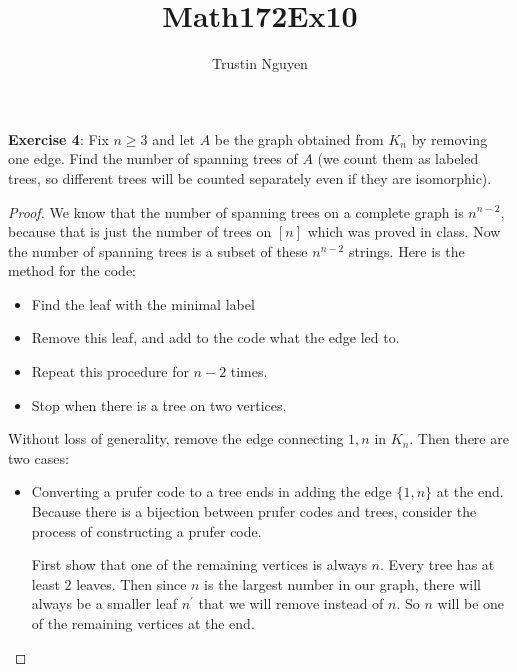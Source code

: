 \documentclass{article}
\title{Math172Ex10}
\author{Trustin Nguyen}
\begin{document}
    \maketitle

\reversemarginpar

\textbf{Exercise 4}: Fix $n \geq 3$ and let $A$ be the graph obtained from $K_{n}$ by removing one edge. Find the number of spanning trees of $A$ (we count them as labeled trees, so different trees will be counted separately even if they are isomorphic).
    \begin{proof}
        We know that the number of spanning trees on a complete graph is $n^{n - 2}$, because that is just the number of trees on $[n]$ which was proved in class. Now the number of spanning trees is a subset of these $n^{n - 2}$ strings. Here is the method for the code:
            \begin{itemize}
                \item Find the leaf with the minimal label

                \item Remove this leaf, and add to the code what the edge led to.

                \item Repeat this procedure for $n - 2$ times. 

                \item Stop when there is a tree on two vertices.
            \end{itemize}

        Without loss of generality, remove the edge connecting $1, n$ in $K_{n}$. Then there are two cases:
            \begin{itemize}
                \item Converting a prufer code to a tree ends in adding the edge $\{1, n\}$ at the end. Because there is a bijection between prufer codes and trees, consider the process of constructing a prufer code. 

                First show that one of the remaining vertices is always $n$. Every tree has at least $2$ leaves. Then since $n$ is the largest number in our graph, there will always be a smaller leaf $n^{\prime}$ that we will remove instead of $n$. So $n$ will be one of the remaining vertices at the end.


\end{itemize}
\end{proof}
\end{document}
